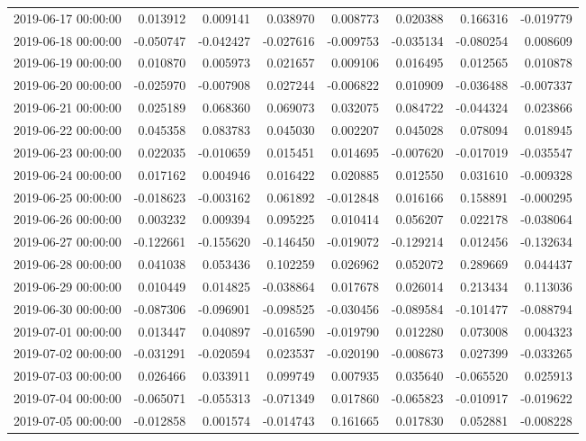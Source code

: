 \begin{tabular}{lrrrrrrr}
2019-06-17 00:00:00 & 0.013912 & 0.009141 & 0.038970 & 0.008773 & 0.020388 & 0.166316 & -0.019779 \\
2019-06-18 00:00:00 & -0.050747 & -0.042427 & -0.027616 & -0.009753 & -0.035134 & -0.080254 & 0.008609 \\
2019-06-19 00:00:00 & 0.010870 & 0.005973 & 0.021657 & 0.009106 & 0.016495 & 0.012565 & 0.010878 \\
2019-06-20 00:00:00 & -0.025970 & -0.007908 & 0.027244 & -0.006822 & 0.010909 & -0.036488 & -0.007337 \\
2019-06-21 00:00:00 & 0.025189 & 0.068360 & 0.069073 & 0.032075 & 0.084722 & -0.044324 & 0.023866 \\
2019-06-22 00:00:00 & 0.045358 & 0.083783 & 0.045030 & 0.002207 & 0.045028 & 0.078094 & 0.018945 \\
2019-06-23 00:00:00 & 0.022035 & -0.010659 & 0.015451 & 0.014695 & -0.007620 & -0.017019 & -0.035547 \\
2019-06-24 00:00:00 & 0.017162 & 0.004946 & 0.016422 & 0.020885 & 0.012550 & 0.031610 & -0.009328 \\
2019-06-25 00:00:00 & -0.018623 & -0.003162 & 0.061892 & -0.012848 & 0.016166 & 0.158891 & -0.000295 \\
2019-06-26 00:00:00 & 0.003232 & 0.009394 & 0.095225 & 0.010414 & 0.056207 & 0.022178 & -0.038064 \\
2019-06-27 00:00:00 & -0.122661 & -0.155620 & -0.146450 & -0.019072 & -0.129214 & 0.012456 & -0.132634 \\
2019-06-28 00:00:00 & 0.041038 & 0.053436 & 0.102259 & 0.026962 & 0.052072 & 0.289669 & 0.044437 \\
2019-06-29 00:00:00 & 0.010449 & 0.014825 & -0.038864 & 0.017678 & 0.026014 & 0.213434 & 0.113036 \\
2019-06-30 00:00:00 & -0.087306 & -0.096901 & -0.098525 & -0.030456 & -0.089584 & -0.101477 & -0.088794 \\
2019-07-01 00:00:00 & 0.013447 & 0.040897 & -0.016590 & -0.019790 & 0.012280 & 0.073008 & 0.004323 \\
2019-07-02 00:00:00 & -0.031291 & -0.020594 & 0.023537 & -0.020190 & -0.008673 & 0.027399 & -0.033265 \\
2019-07-03 00:00:00 & 0.026466 & 0.033911 & 0.099749 & 0.007935 & 0.035640 & -0.065520 & 0.025913 \\
2019-07-04 00:00:00 & -0.065071 & -0.055313 & -0.071349 & 0.017860 & -0.065823 & -0.010917 & -0.019622 \\
2019-07-05 00:00:00 & -0.012858 & 0.001574 & -0.014743 & 0.161665 & 0.017830 & 0.052881 & -0.008228 \\

\end{tabular}
